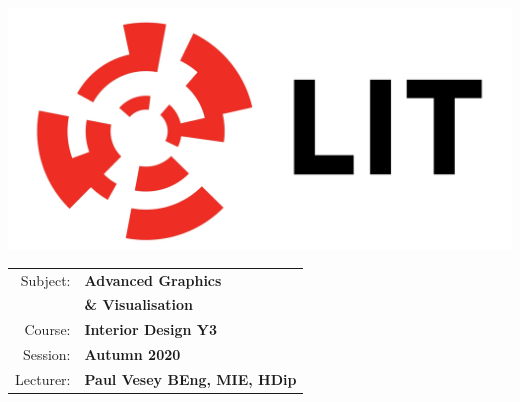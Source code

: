 \documentclass[a4paper, 10pt]{article}
\begin{document}
\lstset{language=HTML,
				basicstyle=\small,
				breaklines=true,
        numbers=left,
        numberstyle=\tiny,
        showstringspaces=false,
        aboveskip=-20pt,
        frame=leftline
        }
				
\begin{table}%
	\begin{minipage}{0.4\textwidth}%
			\includegraphics[width=1\textwidth]{./img/LITlogo.jpg}
	\end{minipage}
	\qquad
	\centering
	\parbox{0.4\textwidth}{
		\begin{large}			
			\begin{tabular}{| r | l |} \hline
				Subject: & \textbf{Advanced Graphics}\\
								 & \textbf{\& Visualisation}\\
				Course: & \textbf{Interior Design Y3}\\
				Session: & \textbf{Autumn 2020}\\
				Lecturer: & \textbf{Paul Vesey \footnotesize{BEng, MIE, HDip}}\\
				\hline
			\end{tabular}
		\end{large}			
	}
\end{table}
\vspace{0.25cm}	
\end{document}
